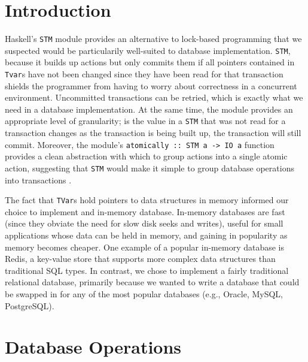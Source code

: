 \documentclass[10pt]{article}
\begin{document}
\vspace{5mm}
\begin{multicols}{2}

\section{Introduction} 
Haskell's \texttt{STM} module provides an alternative to lock-based programming that we suspected would be particularily well-suited to database implementation. \texttt{STM}, because it builds up actions but only commits them if all pointers contained in \texttt{Tvar}s have not been changed since they have been read for that transaction shields the programmer from having to worry about correctness in a concurrent environment. Uncommitted transactions can be retried, which is exactly what we need in a database implementation. At the same time, the module provides an appropriate level of granularity; is the value in a \texttt{STM} that was not read for a transaction changes as the transaction is being built up, the transaction will still commit. Moreover, the module's \texttt{atomically :: STM a -> IO a} function provides a clean abstraction with which to group actions into a single atomic action, suggesting that \texttt{STM} would make it simple to group database operations into transactions \cite{harris}. 

The fact that \texttt{TVar}s hold pointers to data structures in memory informed our choice to implement and in-memory database. In-memory databases are fast (since they obviate the need for slow disk seeks and writes), useful for small applications whose data can be held in memory, and gaining in popularity as memory becomes cheaper. One example of a popular in-memory database is Redis, a key-value store that supports more complex data structures than traditional SQL types. In contrast, we chose to implement a fairly traditional relational database, primarily because we wanted to write a database that could be swapped in for any of the most popular databases (e.g., Oracle, MySQL, PostgreSQL). 

\section{Database Operations}

\end{multicols}
\end{document}
